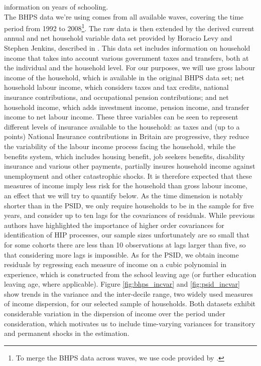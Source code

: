 information on years of schooling. 
 \\
The BHPS data we're using comes from all available waves, covering the time 
period from 1992 to 2008\footnote{To merge the BHPS data across waves, we use 
code provided by \citet{Vandendriessche2015}.}. The raw data is then extended by
the derived current annual and net household variable data set provided by 
Horacio Levy and Stephen Jenkins, described in \citet{Jenkins2010}. This data set 
includes information on household income 
that takes into account various government taxes and transfers, both at the 
individual and the household level. For our purposes, we will use gross labour
income of the household, which is available in the original BHPS data set;
net household labour income, which considers taxes and tax credits, national
insurance contributions, and occupational pension contributions; and net 
household income, which adds investment income, pension income, and transfer
income to net labour income. These three variables can be seen to represent 
different levels of insurance available to the household: as taxes and (up to 
a points) National Insurance contributions in Britain are progressive, they reduce
the variability of the labour income process facing the household, while the
benefits system, which includes housing benefit, job seekers benefits, disability
insurance and various other payments, partially insures household income against
unemployment and other catastrophic shocks. It is therefore expected that these
measures of income imply less risk for the household than gross labour income,
an effect that we will try to quantify below. As the time dimension is notably 
shorter than in the PSID, we only require households to be in the sample 
for five years, and consider up to ten lags for the covariances of residuals. 
While previous authors have highlighted the importance of higher order covariances
for identification of HIP processes, our sample sizes unfortunately are so small
that for some cohorts there are less than 10 observations at lags larger than
five, so that considering more lags is impossible. As for the PSID, we obtain
income residuals by regressing each measure of income on a cubic polynomial 
in experience, which is constructed from the school leaving age (or further
education leaving age, where applicable). Figure \ref{fig:bhps_incvar} and
\ref{fig:psid_incvar} show trends in the variance and the inter-decile range,
two widely used measures of income dispersion, for our selected sample of households.
Both datasets exhibit considerable variation in the dispersion of income over 
the period under consideration, which motivates us to include time-varying
variances for transitory and permanent shocks in the estimation.

